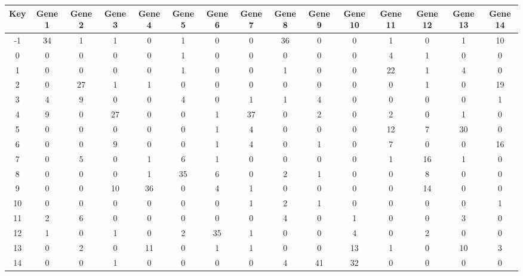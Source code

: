 \begin{tabular}{|c|c|c|c|c|c|c|c|c|c|c|c|c|c|c|}
\hline
Key & Gene 1 & Gene 2 & Gene 3 & Gene 4 & Gene 5 & Gene 6 & Gene 7 & Gene 8 & Gene 9 & Gene 10 & Gene 11 & Gene 12 & Gene 13 & Gene 14 \\
\hline
-1 & 34 & 1 & 1 & 0 & 1 & 0 & 0 & 36 & 0 & 0 & 1 & 0 & 1 & 10 \\
0 & 0 & 0 & 0 & 0 & 1 & 0 & 0 & 0 & 0 & 0 & 4 & 1 & 0 & 0 \\
1 & 0 & 0 & 0 & 0 & 1 & 0 & 0 & 1 & 0 & 0 & 22 & 1 & 4 & 0 \\
2 & 0 & 27 & 1 & 1 & 0 & 0 & 0 & 0 & 0 & 0 & 0 & 1 & 0 & 19 \\
3 & 4 & 9 & 0 & 0 & 4 & 0 & 1 & 1 & 4 & 0 & 0 & 0 & 0 & 1 \\
4 & 9 & 0 & 27 & 0 & 0 & 1 & 37 & 0 & 2 & 0 & 2 & 0 & 1 & 0 \\
5 & 0 & 0 & 0 & 0 & 0 & 1 & 4 & 0 & 0 & 0 & 12 & 7 & 30 & 0 \\
6 & 0 & 0 & 9 & 0 & 0 & 1 & 4 & 0 & 1 & 0 & 7 & 0 & 0 & 16 \\
7 & 0 & 5 & 0 & 1 & 6 & 1 & 0 & 0 & 0 & 0 & 1 & 16 & 1 & 0 \\
8 & 0 & 0 & 0 & 1 & 35 & 6 & 0 & 2 & 1 & 0 & 0 & 8 & 0 & 0 \\
9 & 0 & 0 & 10 & 36 & 0 & 4 & 1 & 0 & 0 & 0 & 0 & 14 & 0 & 0 \\
10 & 0 & 0 & 0 & 0 & 0 & 0 & 1 & 2 & 1 & 0 & 0 & 0 & 0 & 1 \\
11 & 2 & 6 & 0 & 0 & 0 & 0 & 0 & 4 & 0 & 1 & 0 & 0 & 3 & 0 \\
12 & 1 & 0 & 1 & 0 & 2 & 35 & 1 & 0 & 0 & 4 & 0 & 2 & 0 & 0 \\
13 & 0 & 2 & 0 & 11 & 0 & 1 & 1 & 0 & 0 & 13 & 1 & 0 & 10 & 3 \\
14 & 0 & 0 & 1 & 0 & 0 & 0 & 0 & 4 & 41 & 32 & 0 & 0 & 0 & 0 \\
\hline
\end{tabular}